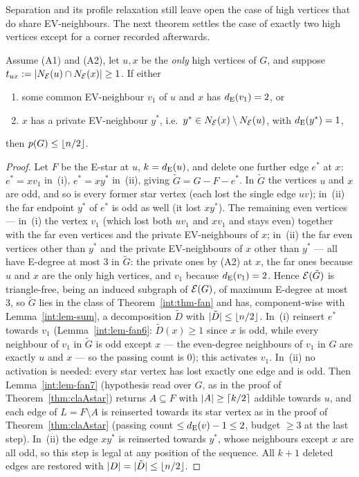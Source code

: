 Separation and its profile relaxation still leave open the case of high
vertices that do share EV-neighbours. The next theorem settles the case of
exactly two high vertices except for a corner recorded afterwards.

\begin{theorem}\label{thm:clatwohigh}
Assume {\rm(A1)} and {\rm(A2)}, let $u,x$ be the \emph{only} high vertices
of $G$, and suppose $t_{ux}:=|N_{\mathcal{E}}(u)\cap N_{\mathcal{E}}(x)|\ge1$. If either
\begin{enumerate}[label={\rm(\roman*)},leftmargin=2em]
\item some common EV-neighbour $v_1$ of $u$ and $x$ has $d_{\mathrm{E}}(v_1)=2$, or
\item $x$ has a private EV-neighbour $y^*$, i.e.\
$y^*\in N_{\mathcal{E}}(x)\setminus N_{\mathcal{E}}(u)$, with $d_{\mathrm{E}}(y^*)=1$,
\end{enumerate}
then $p(G)\le\left\lfloor n/2 \right\rfloor$.
\end{theorem}

\begin{proof}
Let $F$ be the E-star at $u$, $k=d_{\mathrm{E}}(u)$, and delete one further edge
$e^*$ at $x$: $e^*=xv_1$ in~(i), $e^*=xy^*$ in~(ii), giving
$\tilde G=G-F-e^*$. In $\tilde G$ the vertices $u$ and $x$ are odd, and so
is every former star vertex (each lost the single edge $uv$); in~(ii) the
far endpoint $y^*$ of $e^*$ is odd as well (it lost $xy^*$). The remaining
even vertices --- in~(i) the vertex $v_1$ (which lost both $uv_1$ and
$xv_1$ and stays even) together with the far even vertices and the private
EV-neighbours of $x$; in~(ii) the far even vertices other than $y^*$ and
the private EV-neighbours of $x$ other than $y^*$ --- all have E-degree at
most $3$ in $\tilde G$: the private ones by {\rm(A2)} at $x$, the far ones
because $u$ and $x$ are the only high vertices, and $v_1$ because
$d_{\mathrm{E}}(v_1)=2$. Hence $\mathcal{E}(\tilde G)$ is triangle-free, being an induced
subgraph of $\mathcal{E}(G)$, of maximum E-degree at most $3$, so $\tilde G$ lies
in the class of Theorem~\ref{int:thm-fan} and has, component-wise with
Lemma~\ref{int:lem-sum}, a decomposition $\tilde D$ with
$|\tilde D|\le\left\lfloor n/2 \right\rfloor$. In~(i) reinsert $e^*$ towards $v_1$
(Lemma~\ref{int:lem-fan6}: $\tilde D(x)\ge1$ since $x$ is odd, while every
neighbour of $v_1$ in $\tilde G$ is odd except $x$ --- the even-degree
neighbours of $v_1$ in $G$ are exactly $u$ and $x$ --- so the passing
count is $0$); this activates $v_1$. In~(ii) no activation is needed:
every star vertex has lost exactly one edge and is odd. Then
Lemma~\ref{int:lem-fan7} (hypothesis read over $G$, as in the proof of
Theorem~\ref{thm:claAstar}) returns $A\subseteq F$ with $|A|\ge\left\lceil k/2 \right\rceil$
addible towards $u$, and each edge of $L=F\setminus A$ is reinserted
towards its star vertex as in the proof of Theorem~\ref{thm:claAstar}
(passing count $\le d_{\mathrm{E}}(v)-1\le2$, budget $\ge3$ at the last step). In~(ii)
the edge $xy^*$ is reinserted towards $y^*$, whose neighbours except $x$
are all odd, so this step is legal at any position of the sequence. All
$k+1$ deleted edges are restored with $|D|=|\tilde D|\le\left\lfloor n/2 \right\rfloor$.
\end{proof}

